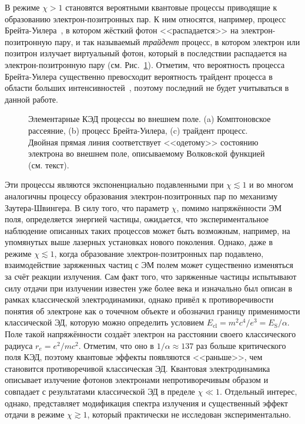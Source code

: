В режиме $\chi > 1$ становятся вероятными квантовые процессы приводящие к образованию электрон-позитронных пар.
К ним относятся, например, процесс Брейта-Уилера~\cite{breit1934collision}, в котором жёсткий фотон <<распадается>> на электрон-позитронную пару, и так называемый \textit{трайдент} процесс, в котором электрон или позитрон излучает виртуальный фотон, который в последствии распадается на электрон-позитронную пару (см. Рис.~\ref{fig:intro/QED}). 
Отметим, что вероятность процесса Брейта-Уилера существенно превосходит вероятность трайдент процесса в области больших интенсивностей~\cite{Bell2008}, поэтому последний не будет учитываться в данной работе.
\begin{figure}[ht]
  \caption[Элементарные КЭД процессы во внешнем поле]{Элементарные КЭД процессы во внешнем поле. (a) Комптоновское рассеяние, (b) процесс Брейта-Уилера, (c) трайдент процесс. Двойная прямая линия соответствует <<одетому>> состоянию электрона во внешнем поле, описываемому Волковcкой функцией (см. текст).}
  \label{fig:intro/QED}
\end{figure}
Эти процессы являются экспоненциально подавленными при $\chi \lesssim 1$ и во многом аналогичны процессу образования электрон-позитронных пар по механизму Заутера-Швингера.
В силу того, что параметр $\chi$, помимо напряжённости ЭМ поля, определяется энергией частицы, ожидается, что экспериментальное наблюдение описанных таких процессов может быть возможным, например, на упомянутых выше лазерных установках нового поколения.
Однако, даже в режиме $\chi \lesssim 1$, когда образование электрон-позитронных пар подавлено, взаимодействие заряженных частиц с ЭМ полем может существенно изменяться за счёт реакции излучения.
Сам факт того, что заряженные частицы испытывают силу отдачи при излучении известен уже более века и изначально был описан в рамках классической электродинамики, однако привёл к противоречивости понятия об электроне как о точечном объекте и обозначил границу применимости классической ЭД, которую можно определить условием ${E_\mathrm{cl} = m^2 c^4 / e^3 = E_\mathrm{S} / \alpha}$.
Поле такой напряжённости создаёт электрон на расстоянии своего классического радиуса $r_e = e^2 / m c^2$.
Отметим, что оно в ${1/\alpha \approx 137}$ раз больше критического поля КЭД, поэтому квантовые эффекты появляются <<раньше>>, чем становится противоречивой классическая ЭД. 
Квантовая электродинамика описывает излучение фотонов электронами непротиворечивым образом и совпадает с результатами классической ЭД в пределе ${\chi\ll1}$.
Отдельный интерес, однако, представляет модификация спектра излучения и существенный эффект отдачи в режиме $\chi \gtrsim 1$, который практически не исследован экспериментально.

